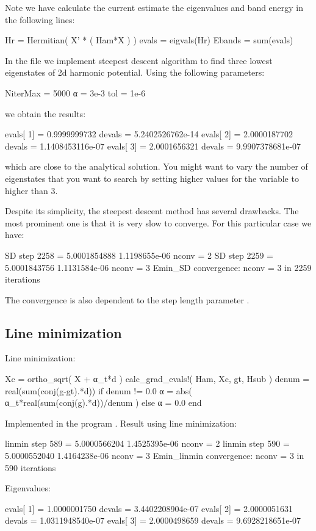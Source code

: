 Note we have calculate the current estimate the eigenvalues and band energy in the following
lines:
\begin{juliacode}
Hr = Hermitian( X' * ( Ham*X ) )
evals = eigvals(Hr)
Ebands = sum(evals)
\end{juliacode}

In the file  we implement steepest descent algorithm
to find three lowest eigenstates of 2d harmonic potential.
Using the following parameters:
\begin{juliacode}
NiterMax = 5000
α = 3e-3
tol = 1e-6
\end{juliacode}
we obtain the results:
\begin{textcode}
evals[  1] =       0.9999999732 devals =   5.2402526762e-14
evals[  2] =       2.0000187702 devals =   1.1408453116e-07
evals[  3] =       2.0001656321 devals =   9.9907378681e-07  
\end{textcode}
which are close to the analytical solution. You might want to vary the number of eigenstates
that you want to search by setting higher values for the variable  to
higher than 3.

Despite its simplicity, the steepest descent method has several drawbacks.
The most prominent one is that it is very slow to converge. For this particular case
we have:
\begin{textcode}
SD step     2258 =       5.0001854888   1.1198655e-06  nconv =     2
SD step     2259 =       5.0001843756   1.1131584e-06  nconv =     3
Emin_SD convergence: nconv =     3 in  2259 iterations
\end{textcode}
The convergence is also dependent to the step length parameter .

\subsection{Line minimization}

Line minimization:
\begin{juliacode}
Xc = ortho_sqrt( X + α_t*d )
calc_grad_evals!( Ham, Xc, gt, Hsub )
denum = real(sum(conj(g-gt).*d))
if denum != 0.0
    α = abs( α_t*real(sum(conj(g).*d))/denum )
else
    α = 0.0
end
\end{juliacode}

Implemented in the program .
Result using line minimization:
\begin{textcode}
linmin step      589 =       5.0000566204   1.4525395e-06  nconv =     2
linmin step      590 =       5.0000552040   1.4164238e-06  nconv =     3
Emin_linmin convergence: nconv =     3 in   590 iterations
  
Eigenvalues:
  
evals[  1] =       1.0000001750 devals =   3.4402208904e-07
evals[  2] =       2.0000051631 devals =   1.0311948540e-07
evals[  3] =       2.0000498659 devals =   9.6928218651e-07  
\end{textcode}


